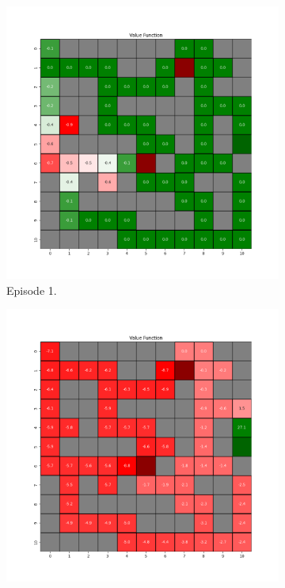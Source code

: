 \documentclass{assignment}
\begin{document}
\begin{figure}[H]
    \begin{subfigure}{0.3\textwidth}
        \includegraphics[width=\textwidth]{figures/value_q/alpha_sweep/value_function_alpha_0.1_gamma_0.95_epsilon_0.2_iteration_1.png}
    \caption{Episode 1.}
    \end{subfigure}\hfill
    \begin{subfigure}{0.3\textwidth}
        \includegraphics[width=\textwidth]{figures/value_q/alpha_sweep/value_function_alpha_0.1_gamma_0.95_epsilon_0.2_iteration_50.png}

\end{subfigure}
\end{figure}
\end{document}
